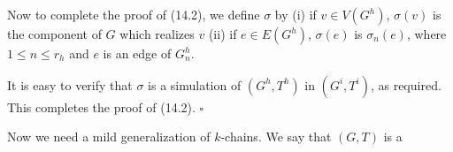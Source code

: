 Now to complete the proof of (14.2), we define $\sigma$ by (i) if $v \in V(G^h)$, $\sigma(v)$ is the component of $G$ which realizes $v$ (ii) if $e \in E(G^h)$, $\sigma(e)$ is $\sigma_n(e)$, where $1 \le n \le r_h$ and $e$ is an edge of $G^h_n$.

It is easy to verify that $\sigma$ is a simulation of $(G^h, T^h)$ in $(G^i, T^i)$, as required. This completes the proof of (14.2). $\square$

Now we need a mild generalization of $k$-chains. We say that $(G, T)$ is a

